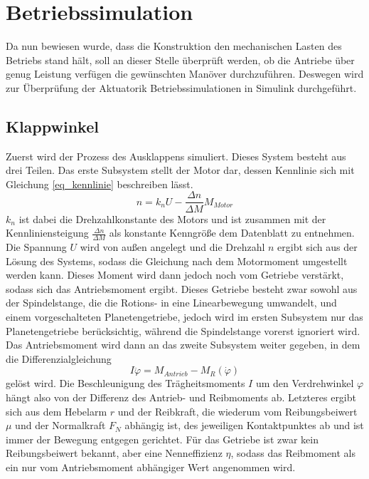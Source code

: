 \section{Betriebssimulation}\label{sec:betriebssim}
Da nun bewiesen wurde, dass die Konstruktion den mechanischen Lasten des Betriebs stand hält, soll an dieser Stelle überprüft werden, ob die Antriebe über genug Leistung verfügen die gewünschten Manöver durchzuführen. Deswegen wird zur Überprüfung der Aktuatorik Betriebssimulationen in Simulink durchgeführt.
\subsection{Klappwinkel}
Zuerst wird der Prozess des Ausklappens simuliert. Dieses System besteht aus drei Teilen. Das erste Subsystem stellt der Motor dar, dessen Kennlinie sich mit Gleichung \ref{eq_kennlinie} beschreiben lässt.
\begin{equation}\label{eq_kennlinie}
	n =k_nU-\frac{\Delta n}{\Delta M}M_{Motor}
\end{equation}
$k_n$ ist dabei die Drehzahlkonstante des Motors und ist zusammen mit der Kennliniensteigung $\frac{\Delta n}{\Delta M}$ als konstante Kenngröße dem Datenblatt zu entnehmen. Die Spannung $U$ wird von außen angelegt und die Drehzahl $n$ ergibt sich aus der Lösung des Systems, sodass die Gleichung nach dem Motormoment umgestellt werden kann. Dieses Moment wird dann jedoch noch vom Getriebe verstärkt, sodass sich das Antriebsmoment ergibt. Dieses Getriebe besteht zwar sowohl aus der Spindelstange, die die Rotions- in eine Linearbewegung umwandelt, und einem vorgeschalteten Planetengetriebe, jedoch wird im ersten Subsystem nur das Planetengetriebe berücksichtig, während die Spindelstange vorerst ignoriert wird. Das Antriebsmoment wird dann an das zweite Subsystem weiter gegeben, in dem die Differenzialgleichung
\begin{equation}
	I\ddot{\varphi} = M_{Antrieb} - M_{R}(\dot{\varphi})
\end{equation}
gelöst wird. Die Beschleunigung des Trägheitsmoments $I$ um den Verdrehwinkel $\varphi$ hängt also von der Differenz des Antrieb- und Reibmoments ab. Letzteres ergibt sich aus dem Hebelarm $r$ und der Reibkraft, die wiederum vom Reibungsbeiwert $\mu$ und der Normalkraft $F_N$ abhängig ist, des jeweiligen Kontaktpunktes ab und ist immer der Bewegung entgegen gerichtet. Für das Getriebe ist zwar kein Reibungsbeiwert bekannt, aber eine Nenneffizienz $\eta$, sodass das Reibmoment als ein nur vom Antriebsmoment abhängiger Wert angenommen wird.
